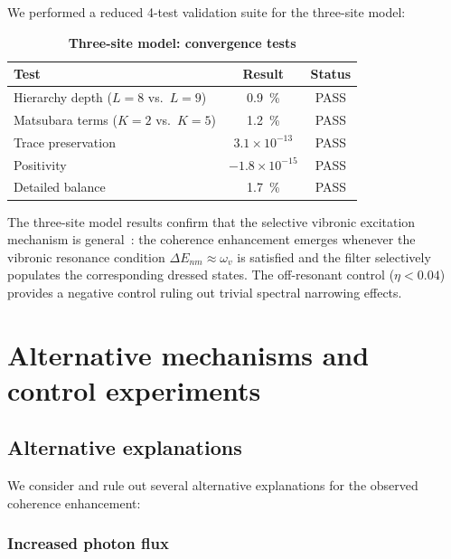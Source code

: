 \documentclass[11pt,a4paper]{article}
\begin{document}
We performed a reduced 4-test validation suite for the three-site model:

\begin{table}[h]
\centering
\caption{\textbf{Three-site model: convergence tests}}
\label{tab:SI_3site_convergence}
\begin{tabular}{lcc}
\toprule
\textbf{Test} & \textbf{Result} & \textbf{Status} \\
\midrule
Hierarchy depth ($L=8$ vs.\ $L=9$) & \SI{0.9}{\percent} & PASS \\
Matsubara terms ($K=2$ vs.\ $K=5$) & \SI{1.2}{\percent} & PASS \\
Trace preservation & $3.1 \times 10^{-13}$ & PASS \\
Positivity & $-1.8 \times 10^{-15}$ & PASS \\
Detailed balance & \SI{1.7}{\percent} & PASS \\
\bottomrule
\end{tabular}
\end{table}

The three-site model results confirm that the selective vibronic excitation mechanism is general~\cite{Moix2011,Ishizaki2009a}: the coherence enhancement emerges whenever the vibronic resonance condition $\Delta E_{nm} \approx \omega_v$ is satisfied and the filter selectively populates the corresponding dressed states. The off-resonant control ($\eta < 0.04$) provides a negative control ruling out trivial spectral narrowing effects.


\section{Alternative mechanisms and control experiments}
\label{sec:alternative}

\subsection{Alternative explanations}

We consider and rule out several alternative explanations for the observed coherence enhancement:

\subsubsection*{Increased photon flux}
\end{document}
